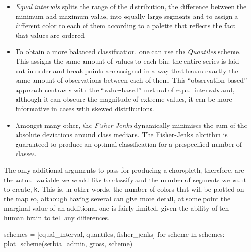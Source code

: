 \documentclass[
  letterpaper,
  DIV=11,
  numbers=noendperiod]{scrreprt}
\newenvironment{Shaded}{\begin{snugshade}}{\end{snugshade}}
\newcommand{\ControlFlowTok}[1]{\textcolor[rgb]{0.00,0.23,0.31}{#1}}
\newcommand{\KeywordTok}[1]{\textcolor[rgb]{0.00,0.23,0.31}{#1}}
\newcommand{\NormalTok}[1]{\textcolor[rgb]{0.00,0.23,0.31}{#1}}
\newcommand{\OperatorTok}[1]{\textcolor[rgb]{0.37,0.37,0.37}{#1}}
\newcommand{\StringTok}[1]{\textcolor[rgb]{0.13,0.47,0.30}{#1}}
\providecommand{\tightlist}{%
  \setlength{\itemsep}{0pt}\setlength{\parskip}{0pt}}\usepackage{longtable,booktabs,array}
\begin{document}
\begin{itemize}
\tightlist
\item
  \emph{Equal intervals} splits the range of the distribution, the
  difference between the minimum and maximum value, into equally large
  segments and to assign a different color to each of them according to
  a palette that reflects the fact that values are ordered.
\item
  To obtain a more balanced classification, one can use the
  \emph{Quantiles} scheme. This assigns the same amount of values to
  each bin: the entire series is laid out in order and break points are
  assigned in a way that leaves exactly the same amount of observations
  between each of them. This ``observation-based'' approach contrasts
  with the ``value-based'' method of equal intervals and, although it
  can obscure the magnitude of extreme values, it can be more
  informative in cases with skewed distributions.
\item
  Amongst many other, the \emph{Fisher Jenks} dynamically minimises the
  sum of the absolute deviations around class medians. The Fisher-Jenks
  alorithm is guaranteed to produce an optimal classification for a
  prespecified number of classes.
\end{itemize}

The only additional arguments to pass for producing a choropleth,
therefore, are the actual variable we would like to classify and the
number of segments we want to create, \texttt{k}. This is, in other
words, the number of colors that will be plotted on the map so, although
having several can give more detail, at some point the marginal value of
an additional one is fairly limited, given the ability of teh human
brain to tell any differences.

\begin{Shaded}
\begin{Highlighting}[]
\NormalTok{schemes }\OperatorTok{=}\NormalTok{ [}\StringTok{\textquotesingle{}equal\_interval\textquotesingle{}}\NormalTok{, }\StringTok{\textquotesingle{}quantiles\textquotesingle{}}\NormalTok{, }\StringTok{\textquotesingle{}fisher\_jenks\textquotesingle{}}\NormalTok{]}
\ControlFlowTok{for}\NormalTok{ scheme }\KeywordTok{in}\NormalTok{ schemes:}
\NormalTok{    plot\_scheme(serbia\_admin, }\StringTok{\textquotesingle{}gross\textquotesingle{}}\NormalTok{, scheme)}
\end{Highlighting}
\end{Shaded}
\end{document}
